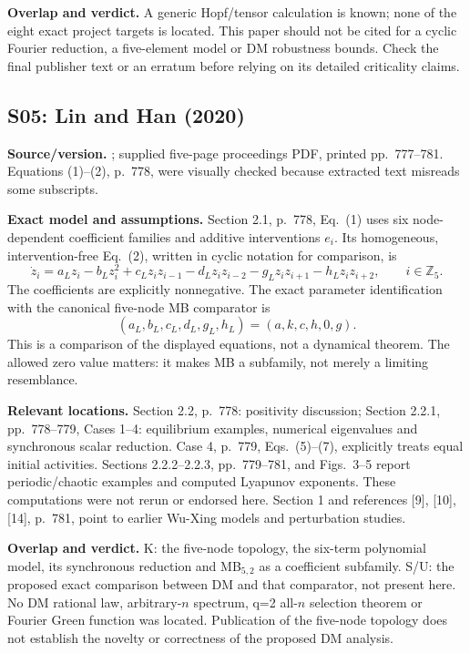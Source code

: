 \textbf{Overlap and verdict.} A generic Hopf/tensor calculation is known;
none of the eight exact project targets is located. This paper should
not be cited for a cyclic Fourier reduction, a five-element model or
DM robustness bounds. Check the final publisher text or an erratum
before relying on its detailed criticality claims.

\subsection{S05: Lin and Han (2020)}
\label{src:lin}
\textbf{Source/version.} \cite{LinHan2020}; supplied five-page proceedings
PDF, printed pp.~777--781. Equations (1)--(2), p.~778, were visually
checked because extracted text misreads some subscripts.

\textbf{Exact model and assumptions.} Section 2.1, p.~778, Eq.~(1)
uses six node-dependent coefficient families and additive interventions
$e_i$. Its homogeneous, intervention-free Eq.~(2), written in cyclic
notation for comparison, is
\[
 \dot z_i=a_Lz_i-b_Lz_i^2+c_Lz_iz_{i-1}
       -d_Lz_iz_{i-2}-g_Lz_iz_{i+1}-h_Lz_iz_{i+2},
       \qquad i\in\mathbb Z_5.
\]
The coefficients are explicitly nonnegative. The exact parameter
identification with the canonical five-node MB comparator is
\[
 (a_L,b_L,c_L,d_L,g_L,h_L)=(a,k,c,h,0,g).
\]
This is a comparison of the displayed equations, not a dynamical theorem.
The allowed zero value matters: it makes MB a subfamily, not merely a
limiting resemblance.

\textbf{Relevant locations.} Section 2.2, p.~778: positivity discussion;
Section 2.2.1, pp.~778--779, Cases 1--4: equilibrium examples, numerical
eigenvalues and synchronous scalar reduction. Case 4, p.~779,
Eqs.~(5)--(7), explicitly treats equal initial activities. Sections
2.2.2--2.2.3, pp.~779--781, and Figs.~3--5 report periodic/chaotic
examples and computed Lyapunov exponents. These computations were
not rerun or endorsed here. Section 1 and references [9], [10], [14],
p.~781, point to earlier Wu-Xing models and perturbation studies.

\textbf{Overlap and verdict.} K: the five-node topology, the six-term
polynomial model, its synchronous reduction and MB$_{5,2}$ as a
coefficient subfamily. S/U: the proposed exact comparison between DM
and that comparator, not present here. No DM rational law, arbitrary-$n$
spectrum, q=2 all-$n$ selection theorem or Fourier Green function was
located. Publication of the five-node topology does not establish the
novelty or correctness of the proposed DM analysis.

